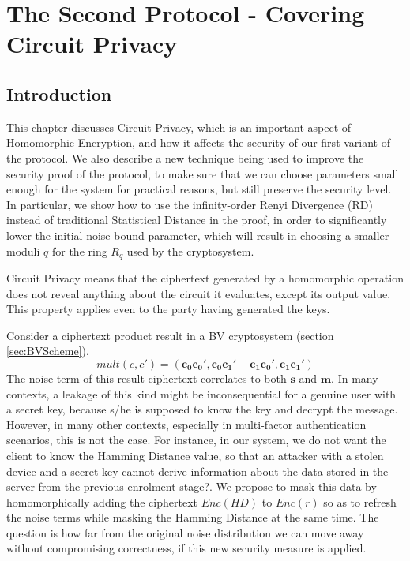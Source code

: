 \chapter{The Second Protocol - Covering Circuit Privacy}
\label{chap:renyiDivergence}

\ifpdf
    \graphicspath{{Chapter4/Figs/Raster/}{Chapter4/Figs/PDF/}{Chapter4/Figs/}}
\else
    \graphicspath{{Chapter4/Figs/Vector/}{Chapter4/Figs/}}
\fi

\section{Introduction}
\label{sec:secProcIntro}
This chapter discusses Circuit Privacy, which is an important aspect of
Homomorphic Encryption, and how it affects the security of our first variant
of the protocol. We also describe a new technique being used to improve the
security proof of the protocol, to make sure that we can choose parameters small
enough for the system for practical reasons, but still preserve the security level. In
particular, we show how to use the infinity-order Renyi Divergence (RD) instead of
traditional Statistical Distance in the proof, in order to significantly lower the initial noise bound parameter, which will result in
choosing a smaller moduli \(q\) for the ring \(R_{q}\) used by the
cryptosystem.

Circuit Privacy means that the ciphertext generated by a homomorphic operation
does not reveal anything about the circuit it evaluates, except its output
value. This property applies even to the party having generated the
keys.

Consider a ciphertext product result in a BV cryptosystem (section
\ref{sec:BVScheme}).
\[
  mult(c,c') = (\mathbf{c_0}\mathbf{c_0'}, \mathbf{c_0}\mathbf{c_1'} +
  \mathbf{c_1}\mathbf{c_0'}, \mathbf{c_1}\mathbf{c_1'})
\]
The noise term of this result ciphertext correlates to both $\mathbf{s}$ and $\mathbf{m}$.
In many contexts, a leakage of this kind might be inconsequential for a genuine user with a secret key, because s/he is supposed to know the key and decrypt the message.
However, in many other contexts, especially in multi-factor authentication
scenarios, this is not the case. For instance, in our system, we do not want the
client to know the Hamming Distance value, so that an attacker with a stolen
device and a secret key cannot derive information about the data stored in the
server from the previous enrolment stage?. We propose to mask this data by homomorphically adding the ciphertext
$Enc(HD)$ to $Enc(r)$ so as to refresh the noise terms while masking the Hamming Distance at the same time. The question is how far from the original noise distribution we can move away without compromising correctness, if this new security measure is applied.

